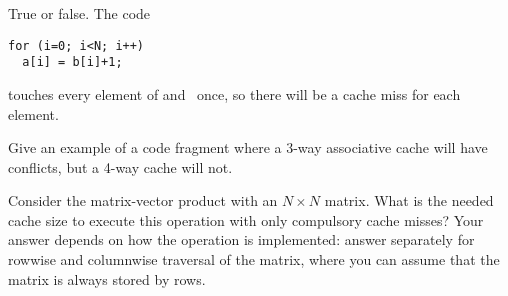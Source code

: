 \begin{exercise}
  True or false. The code
\begin{verbatim}
for (i=0; i<N; i++)
  a[i] = b[i]+1;
\end{verbatim}
touches every element of  and~ once, so there will be a cache miss
for each element.
\end{exercise}

\begin{exercise}
  Give an example of a code fragment where a 3-way associative cache will
  have conflicts, but a 4-way cache will not.
\end{exercise}

\begin{exercise}
  \label{ex:mvp-reuse}
  Consider the matrix-vector product with an $N\times N$ matrix.
  What is the needed cache size to execute this operation with only
  compulsory cache misses? Your answer depends on how the operation
  is implemented: answer separately for rowwise and columnwise traversal
  of the matrix, where you can assume that the matrix is always stored by rows.
\end{exercise}

\endinput

\begin{exercise}
  Consider the matrix-vector product operation $y\leftarrow
  Ax$ 
  (the Blas operation for the matrix vector product
    computes $y\leftarrow Ax+y$. The difference in the code involved
    is minimal):
\begin{verbatim}
for (i<M) {
  s = 0
  for (j<N) {
    s = s + a[i][j] * x[j]; }
  y[i] = s
}
\end{verbatim}
  Can you think of at least one reason why the case $M<N$ would be
  more efficient than $M>N$?
\end{exercise}

exercises:
diagonal format through CRS, why less efficient?

futility of unrolling for memory-bound ops

does manual unrolling help?

Chip power:
\[ P=C_TV_{dd}^2f\gamma \]
where $C_T$ is the effective chip capacitance, $V_{dd}$~is the supply
voltage, $f$~the clock frequency, and $\gamma$~the probability that a
0--1 transition occurs.
Increasing the number of cores increases $C_T$: linear effect.

\[ P=C_TV_{dd}^2f+V_{dd}I_{st}+V_{dd}I_{leak} \]

